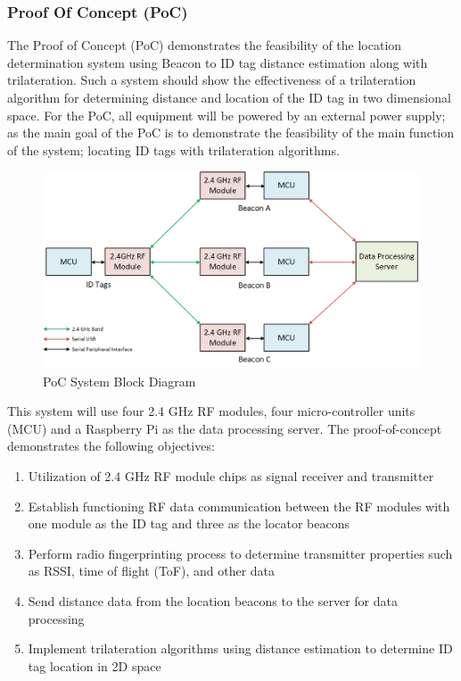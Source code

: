 \break
\subsubsection{Proof Of Concept (PoC)}
The Proof of Concept (\Gls{PoC}) demonstrates the feasibility of the location determination system using Beacon to ID tag distance estimation along with trilateration. Such a system should show the effectiveness of a trilateration algorithm for determining distance and location of the ID tag in two dimensional space. For the PoC, all equipment will be powered by an external power supply; as the main goal of the PoC is to demonstrate the feasibility of the main function of the system; locating ID tags with trilateration algorithms.

\begin{figure}[h!]
    \centering
    \includegraphics[width=\linewidth]{./images/01_sys_PoC.png}
    \caption{PoC System Block Diagram}
    \label{fig:PoC_sys_blk}
\end{figure}
\bigskip

This system will use four 2.4 GHz \Gls{RF} modules, four micro-controller units (\Gls{MCU}) and a Raspberry Pi as the data processing server. The proof-of-concept demonstrates the following objectives:

\begin{enumerate}
    \item Utilization of 2.4 GHz RF module chips as signal receiver and transmitter
    \item Establish functioning RF data communication between the RF modules with one module as the ID tag and three as the locator beacons
    \item Perform radio fingerprinting process to determine transmitter properties such as RSSI, time of flight (\Gls{ToF}), and other data
    \item Send distance data from the location beacons to the server for data processing
    \item Implement trilateration algorithms using distance estimation to determine ID tag location in 2D space
\end{enumerate}

